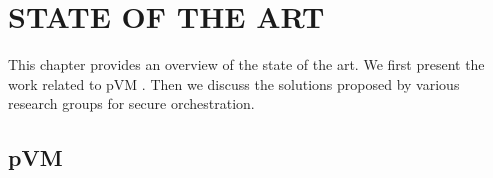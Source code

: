 \chapter{STATE OF THE ART}
\label{see:art}







This chapter provides an overview of the state of the art. We first present the work related to pVM . Then we discuss the solutions proposed by various research groups for secure orchestration.

\section{pVM}

